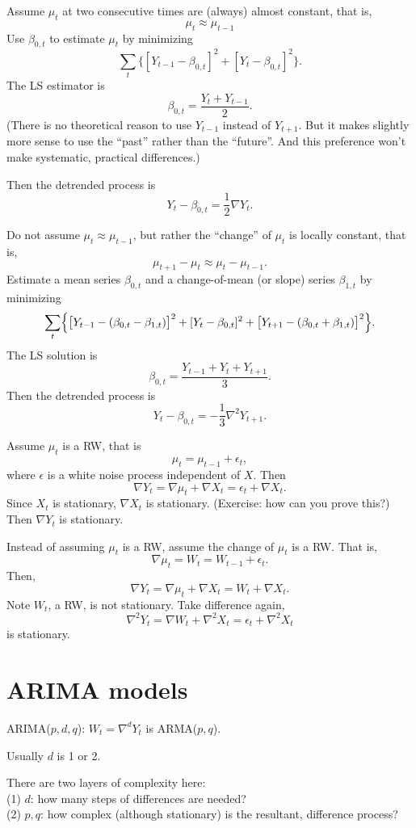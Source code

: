 \documentclass[12pt]{article}
\begin{document}
\begin{enumerate}
\example
Assume $\mu_t$ at two consecutive times are (always) almost constant,
that is,
\[
\mu_t \approx \mu_{t-1}
\]
Use $\beta_{0,t}$ to estimate $\mu_t$ by minimizing
\[
\sum_t \bigl\{ [Y_{t-1} - \beta_{0,t}]^2
    + [Y_{t} - \beta_{0,t}]^2 \bigr\}.
\]
The LS estimator is
\[
\beta_{0,t} = \frac{Y_t + Y_{t-1}}{2}.
\]
(There is no theoretical reason to use $Y_{t-1}$ instead of $Y_{t+1}$.
But it makes slightly more sense to use the ``past'' rather than the
``future''. And this preference won't make systematic, practical
differences.)

Then the detrended process is
\[
Y_t - \beta_{0,t} = \frac{1}{2}\nabla Y_t.
\]

\example
Do not assume $\mu_t \approx \mu_{t-1}$, but rather the ``change'' of
$\mu_t$ is locally constant, that is,
\[
\mu_{t+1} - \mu_t \approx \mu_t - \mu_{t-1}.
\]
Estimate a mean series $\beta_{0,t}$ and a change-of-mean (or slope)
series $\beta_{1,t}$ by minimizing
\[
\sum_t \Bigl\{
    \bigl[Y_{t-1} - (\beta_{0,t} - \beta_{1,t})\bigr]^2 +
    [Y_t - \beta_{0,t}]^2 +
    \bigl[Y_{t+1} - (\beta_{0,t} + \beta_{1,t})\bigr]^2
    \Bigr\}
    .
\]
The LS solution is
\[
\beta_{0,t} = \frac{Y_{t-1} + Y_t + Y_{t+1}}{3}.
\]
Then the detrended process is
\[
Y_t - \beta_{0,t} = -\frac{1}{3}\nabla^2 Y_{t+1}
.
\]

\example
Assume $\mu_t$ is a RW, that is
\[
\mu_t = \mu_{t-1} + \epsilon_t,
\]
where $\epsilon$ is a white noise process independent of $X$.
Then
\[
\nabla Y_t = \nabla \mu_t + \nabla X_t
= \epsilon_t + \nabla X_t.
\]
Since $X_t$ is stationary,
$\nabla X_t$ is stationary.
(Exercise: how can you prove this?)
Then $\nabla Y_t$ is stationary.

\example
Instead of assuming $\mu_t$ is a RW,
assume the change of $\mu_t$ is a RW.
That is,
\[
\nabla \mu_t = W_t = W_{t-1} + \epsilon_t.
\]
Then,
\[
\nabla Y_t
= \nabla \mu_t + \nabla X_t
= W_t + \nabla X_t.
\]
Note $W_t$, a RW, is not stationary.
Take difference again,
\[
\nabla^2 Y_t
= \nabla W_t + \nabla^2 X_t
= \epsilon_t + \nabla^2 X_t
\]
is stationary.

\section{ARIMA models}

ARIMA($p,d,q$): $W_t = \nabla^d Y_t$ is ARMA($p,q$).

Usually $d$ is 1 or 2.

There are two layers of complexity here:\\
(1) $d$: how many steps of differences are needed?\\
(2) $p,q$: how complex (although stationary)
    is the resultant, difference process?


\end{enumerate}
\end{document}

